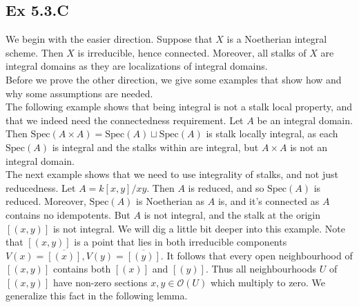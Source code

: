 \documentclass{article}
\theoremstyle{definition}
\newcommand{\oo}{\mathcal{O}}
\newcommand{\Spec}{\text{Spec}}
\begin{document}
\subsection*{Ex 5.3.C}

We begin with the easier direction. Suppose that $X$ is a Noetherian integral
scheme. Then $X$ is irreducible, hence connected. Moreover, all stalks of $X$
are integral domains as they are localizations of integral domains. \\

Before we prove the other direction, we give some examples that show how and
why some assumptions are needed. \\

The following example shows that being integral is not a stalk local property,
and that we indeed need the connectedness requirement. Let $A$ be an integral
domain. Then $\Spec(A \times A) = \Spec(A) \sqcup \Spec(A)$ is stalk locally
integral, as each $\Spec(A)$ is integral and the stalks within are integral,
but $A \times A$ is not an integral domain. \\

The next example shows that we need to use integrality of stalks, and not just
reducedness. Let $A = k[x, y]/xy$. Then $A$ is reduced, and so $\Spec(A)$ is
reduced. Moreover, $\Spec(A)$ is Noetherian as $A$ is, and it's connected as
$A$ contains no idempotents. But $A$ is not integral, and the stalk at the
origin $[(x, y)]$ is not integral. We will dig a little bit deeper into this
example. Note that $[(x, y)]$ is a point that lies in both irreducible
components $V(x) = \overline{[(x)]}, V(y) = \overline{[(y)]}$. It follows that
every open neighbourhood of $[(x, y)]$ contains both $[(x)]$ and $[(y)]$. Thus
all neighbourhoods $U$ of $[(x, y)]$ have non-zero sections $x, y \in \oo(U)$
which multiply to zero. We generalize this fact in the following lemma.
\end{document}
